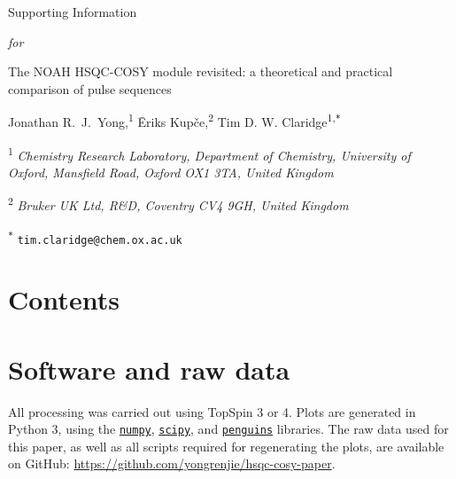 \documentclass[a4paper,12pt]{article}
\newcommand{\me}{Jonathan R.\ J.\ Yong}
\newcommand{\eriks}{{\=E}riks Kup{\v{c}}e}
\newcommand{\tim}{Tim D. W. Claridge}
\newcommand{\articletitle}{The NOAH HSQC-COSY module revisited: a theoretical and practical comparison of pulse sequences}
\newcommand{\crl}{Chemistry Research Laboratory, Department of Chemistry, University of Oxford, Mansfield Road, Oxford OX1 3TA, United Kingdom}
\newcommand{\brukeruk}{Bruker UK Ltd, R\&D, Coventry CV4 9GH, United Kingdom}
\begin{document}
\clearpage
\begin{refsection}
\newcommand{\sectionbreak}{\clearpage}
\renewcommand*{\thefigure}{S\arabic{figure}}
\renewcommand*{\thesection}{S\arabic{section}}
\renewcommand*{\thetable}{S\arabic{table}}
\renewcommand*{\thepage}{S\arabic{page}}
\setcounter{page}{1}
\setcounter{figure}{0}
\setcounter{section}{0}
\setcounter{table}{0}
\onehalfspacing

\hspace{0pt}
\vfill
\begin{center}
    \huge
    Supporting Information

    \vspace{0.3cm}

    \textit{for}

    \vspace{0.3cm}

    \articletitle{}

    \vspace{0.6cm}

    \Large \me{},\textsuperscript{1} \eriks{},\textsuperscript{2} \tim{}\textsuperscript{1,\texttt{*}}

    \vspace{0.6cm}

    \large \textsuperscript{1} \textit{\crl{}}

    \textsuperscript{2} \textit{\brukeruk{}}

    \textsuperscript{\texttt{*}} \texttt{tim.claridge@chem.ox.ac.uk}

\end{center}
\vfill

\newpage
\section*{Contents}

\startcontents[si]
\vfill
\hspace{0pt}
\newpage
\section{Software and raw data}

All processing was carried out using TopSpin 3 or 4.
Plots are generated in Python 3, using the \href{https://github.com/numpy/numpy}{\texttt{numpy}}, \href{https://github.com/scipy/scipy}{\texttt{scipy}}, and \href{https://github.com/yongrenjie/penguins}{\texttt{penguins}} libraries.
The raw data used for this paper, as well as all scripts required for regenerating the plots, are available on GitHub: \url{https://github.com/yongrenjie/hsqc-cosy-paper}.


\clearpage    %

\end{refsection}
\end{document}
